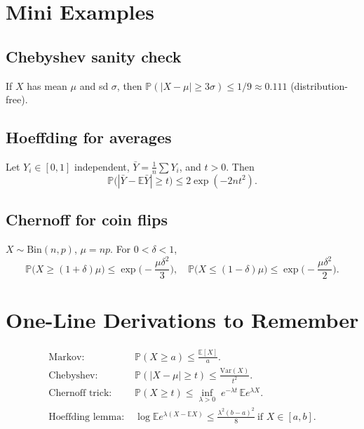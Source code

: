 \documentclass[11pt]{article}
\begin{document}
\section{Mini Examples}
\subsection*{Chebyshev sanity check}
If $X$ has mean $\mu$ and sd $\sigma$, then
$\mathbb{P}(|X-\mu|\ge 3\sigma) \le 1/9 \approx 0.111$ (distribution-free).

\subsection*{Hoeffding for averages}
Let $Y_i\in[0,1]$ independent, $\bar Y=\frac1n\sum Y_i$, and $t>0$.
Then
\[
		\mathbb{P}\big(|\bar Y-\mathbb{E}\bar Y|\ge t\big)
		\le 2\exp(-2nt^2).
\]

\subsection*{Chernoff for coin flips}
$X\sim\mathrm{Bin}(n,p)$, $\mu=np$. For $0<\delta<1$,
\[
		\mathbb{P}\big(X\ge (1+\delta)\mu\big)
		\le \exp\!\Big(-\frac{\mu\delta^2}{3}\Big),\quad
		\mathbb{P}\big(X\le (1-\delta)\mu\big)
		\le \exp\!\Big(-\frac{\mu\delta^2}{2}\Big).
\]

\section{One-Line Derivations to Remember}
\begin{align*}
		\text{Markov:}\;& \mathbb{P}(X\ge a) \le \frac{\mathbb{E}[X]}{a}.\\
		\text{Chebyshev:}\;& \mathbb{P}(|X-\mu|\ge t) \le \frac{\mathrm{Var}(X)}{t^2}.\\
		\text{Chernoff trick:}\;& \mathbb{P}(X\ge t) \le \inf_{\lambda>0}\; e^{-\lambda
		t}\,\mathbb{E}e^{\lambda X}.\\
		\text{Hoeffding lemma:}\;& \log \mathbb{E}e^{\lambda(X-\mathbb{E}X)} \le
		\frac{\lambda^2(b-a)^2}{8}\ \text{if }X\in[a,b].
\end{align*}
\end{document}
